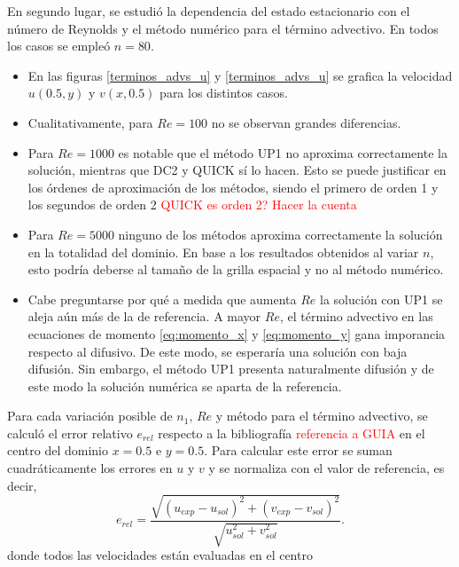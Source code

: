 \documentclass[aps,prb,twocolumn,superscriptaddress,floatfix,longbibliography,10pt]{revtex4-2}
\newif\ifptitle
\newif\ifpnumber
\newcounter{para}
\newcommand\ptitle[1]{\par\refstepcounter{para}
{\ifpnumber{\noindent\textcolor{lightgray}{\textbf{\thepara}}\indent}\fi}
{\ifptitle{\textbf{[{#1}]}}\fi}}
\begin{document}
\ptitle{Comparación cualitativa entre métodos numéricos para distintos Re}
En segundo lugar, se estudió la dependencia del estado estacionario con el número de Reynolds y el método numérico para el término advectivo. En todos los casos se empleó $n = 80$.

\begin{itemize}
  \item En las figuras \ref{terminos_advs_u} y \ref{terminos_advs_u} se grafica la velocidad $u(0.5,y)$ y $v(x,0.5)$ para los distintos casos. 
  \item Cualitativamente, para $Re = 100$ no se observan grandes diferencias.
  \item Para $Re = 1000$ es notable que el método UP1 no aproxima correctamente la solución, mientras que DC2 y QUICK sí lo hacen. Esto se puede justificar en los órdenes de aproximación de los métodos, siendo el primero de orden 1 y los segundos de orden 2 \textcolor{red}{QUICK es orden 2? Hacer la cuenta}
  \item Para $Re = 5000$ ninguno de los métodos aproxima correctamente la solución en la totalidad del dominio. En base a los resultados obtenidos al variar $n$, esto podría deberse al tamaño de la grilla espacial y no al método numérico.
  \item Cabe preguntarse por qué a medida que aumenta $Re$ la solución con UP1 se aleja aún más de la de referencia. A mayor $Re$, el término advectivo en las ecuaciones de momento \ref{eq:momento_x} y \ref{eq:momento_y} gana imporancia respecto al difusivo. De este modo, se esperaría una solución con baja difusión. Sin embargo, el método UP1 presenta naturalmente difusión y de este modo la solución numérica se aparta de la referencia.
\end{itemize}

\ptitle{Comparación numérica entre métodos numéricos para distintos $Re$.}
Para cada variación posible de $n_1$, $Re$ y método para el término advectivo, se calculó el error relativo $e_{rel}$ respecto a la bibliografía \textcolor{red}{referencia a GUIA} en el centro del dominio $x = 0.5$ e $y = 0.5$. Para calcular este error se suman cuadráticamente los errores en $u$ y $v$ y se normaliza con el valor de referencia, es decir,
\[e_{rel} = \frac{\sqrt{(u_{exp} - u_{sol})^2 + (v_{exp} - v_{sol})^2}}{\sqrt{u_{sol}^2 + v_{sol}^2}}. \]
donde todos las velocidades están evaluadas en el centro


\end{document}

